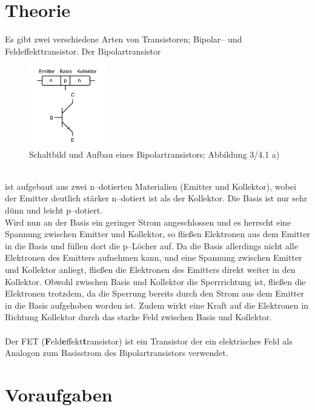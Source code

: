 \documentclass[a4paper,12pt]{article}
\numberwithin{equation}{section}
\begin{document}
\section{Theorie}
Es gibt zwei verschiedene Arten von Transistoren; Bipolar-- und Feldeffekttransistor.
Der Bipolartransistor
\begin{figure}[h]
        \centering
        \includegraphics[width=0.3\textwidth]{bipolartransistor.png}
        \caption{Schaltbild und Aufbau eines Bipolartransistors; Abbildung 3/4.1 a) \cite{Praktikumsanleitung}}
\end{figure}\\
ist aufgebaut aus zwei n--dotierten Materialien (Emitter und Kollektor), wobei der Emitter deutlich stärker n--dotiert ist als der Kollektor.
Die Basis ist nur sehr dünn und leicht p--dotiert.
\\\indent Wird nun an der Basis ein geringer Strom angeschlossen und es herrscht eine Spannung zwischen Emitter und Kollektor, so fließen Elektronen aus dem Emitter in die Basis und füllen dort die p--Löcher auf.
Da die Basis allerdings nicht alle Elektronen des Emitters aufnehmen kann, und eine Spannung zwischen Emitter und Kollektor anliegt, fließen die Elektronen des Emitters direkt weiter in den Kollektor.
Obwohl zwischen Basis und Kollektor die Sperrrichtung ist, fließen die Elektronen trotzdem, da die Sperrung bereits durch den Strom aus dem Emitter in die Basis aufgehoben worden ist.
Zudem wirkt eine Kraft auf die Elektronen in Richtung Kollektor durch das starke Feld zwischen Basis und Kollektor.
\\\\ Der FET (\textbf{F}eld\textbf{e}ffekt\textbf{t}ransistor) ist ein Transistor der ein elektrisches Feld als Analogon zum Basisstrom des Bipolartransistors verwendet.

\clearpage
\section{Voraufgaben}
\end{document}
